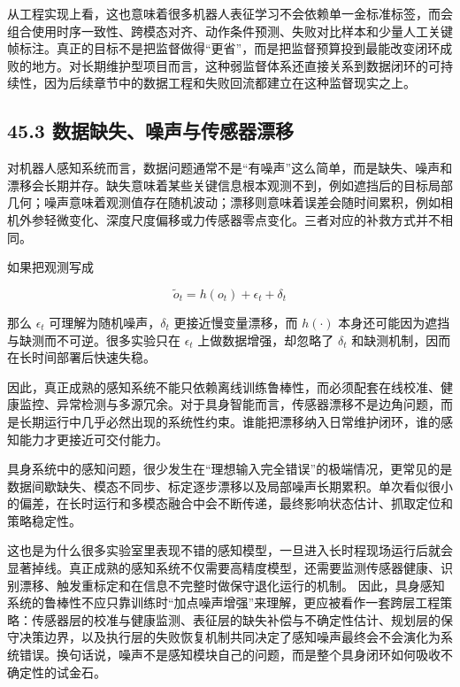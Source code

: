从工程实现上看，这也意味着很多机器人表征学习不会依赖单一金标准标签，而会组合使用时序一致性、跨模态对齐、动作条件预测、失败对比样本和少量人工关键帧标注。真正的目标不是把监督做得“更省”，而是把监督预算投到最能改变闭环成败的地方。对长期维护型项目而言，这种弱监督体系还直接关系到数据闭环的可持续性，因为后续章节中的数据工程和失败回流都建立在这种监督现实之上。

\subsection*{45.3 数据缺失、噪声与传感器漂移}


对机器人感知系统而言，数据问题通常不是“有噪声”这么简单，而是缺失、噪声和漂移会长期并存。缺失意味着某些关键信息根本观测不到，例如遮挡后的目标局部几何；噪声意味着观测值存在随机波动；漂移则意味着误差会随时间累积，例如相机外参轻微变化、深度尺度偏移或力传感器零点变化。三者对应的补救方式并不相同。

如果把观测写成

\begin{equation*}
\tilde{o}_t = h(o_t) + \epsilon_t + \delta_t
\end{equation*}

那么 \(\epsilon_t\) 可理解为随机噪声，\(\delta_t\) 更接近慢变量漂移，而 \(h(\cdot)\) 本身还可能因为遮挡与缺测而不可逆。很多实验只在 \(\epsilon_t\) 上做数据增强，却忽略了 \(\delta_t\) 和缺测机制，因而在长时间部署后快速失稳。

因此，真正成熟的感知系统不能只依赖离线训练鲁棒性，而必须配套在线校准、健康监控、异常检测与多源冗余。对于具身智能而言，传感器漂移不是边角问题，而是长期运行中几乎必然出现的系统性约束。谁能把漂移纳入日常维护闭环，谁的感知能力才更接近可交付能力。

具身系统中的感知问题，很少发生在“理想输入完全错误”的极端情况，更常见的是数据间歇缺失、模态不同步、标定逐步漂移以及局部噪声长期累积。单次看似很小的偏差，在长时运行和多模态融合中会不断传递，最终影响状态估计、抓取定位和策略稳定性。

这也是为什么很多实验室里表现不错的感知模型，一旦进入长时程现场运行后就会显著掉线。真正成熟的感知系统不仅需要高精度模型，还需要监测传感器健康、识别漂移、触发重标定和在信息不完整时做保守退化运行的机制。 因此，具身感知系统的鲁棒性不应只靠训练时“加点噪声增强”来理解，更应被看作一套跨层工程策略：传感器层的校准与健康监测、表征层的缺失补偿与不确定性估计、规划层的保守决策边界，以及执行层的失败恢复机制共同决定了感知噪声最终会不会演化为系统错误。换句话说，噪声不是感知模块自己的问题，而是整个具身闭环如何吸收不确定性的试金石。


